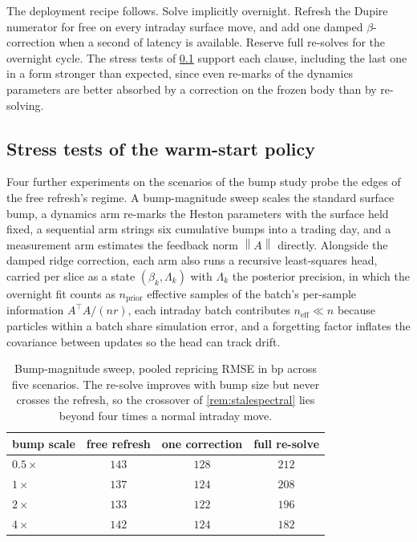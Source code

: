 \documentclass[11pt,a4paper]{article}
\theoremstyle{plain}
\theoremstyle{definition}
\theoremstyle{definition}
\newcommand{\norm}[1]{\left\lVert #1 \right\rVert}
\begin{document}
The deployment recipe follows. Solve implicitly overnight. Refresh the Dupire numerator for free on every intraday surface move, and add one damped $\beta$-correction when a second of latency is available. Reserve full re-solves for the overnight cycle. The stress tests of \cref{subsec:warmsuite} support each clause, including the last one in a form stronger than expected, since even re-marks of the dynamics parameters are better absorbed by a correction on the frozen body than by re-solving.

\subsection{Stress tests of the warm-start policy}\label{subsec:warmsuite}

Four further experiments on the scenarios of the bump study probe the edges of the free refresh's regime. A bump-magnitude sweep scales the standard surface bump, a dynamics arm re-marks the Heston parameters with the surface held fixed, a sequential arm strings six cumulative bumps into a trading day, and a measurement arm estimates the feedback norm $\norm{A}$ directly. Alongside the damped ridge correction, each arm also runs a recursive least-squares head, carried per slice as a state $(\beta_k, \Lambda_k)$ with $\Lambda_k$ the posterior precision, in which the overnight fit counts as $n_{\mathrm{prior}}$ effective samples of the batch's per-sample information $A^\top A/(nr)$, each intraday batch contributes $n_{\mathrm{eff}} \ll n$ because particles within a batch share simulation error, and a forgetting factor inflates the covariance between updates so the head can track drift.

\begin{table}[t]
\centering
\begin{tabular}{lccc}
\toprule
bump scale & free refresh & one correction & full re-solve \\
\midrule
$0.5\times$ & $143$ & $128$ & $212$ \\
$1\times$   & $137$ & $124$ & $208$ \\
$2\times$   & $133$ & $122$ & $196$ \\
$4\times$   & $142$ & $124$ & $182$ \\
\bottomrule
\end{tabular}
\caption{Bump-magnitude sweep, pooled repricing RMSE in bp across five scenarios. The re-solve improves with bump size but never crosses the refresh, so the crossover of \cref{rem:stalespectral} lies beyond four times a normal intraday move.}
\label{tab:xover}
\end{table}
\end{document}
